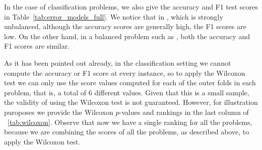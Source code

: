 In the case of classification problems, we also give the accuracy and F1 test scores in Table~\ref{tab:error_models_full}. We notice that in , which is strongly unbalanced, although the accuracy scores are generally high, the F1 scores are low. On the other hand, in a balanced problem such as , both the accuracy and F1 scores are similar.
%

As it has been pointed out already, in the classification setting we cannot compute the accuracy or F1 score at every instance, so to apply the Wilcoxon test we can only use the score values computed for each of the outer folds in each problem, that is, a total of $6$ different values.
Given that this is a small sample, the validity of using the Wilcoxon test is not guaranteed. However, for illustration puroposes we provide the Wilcoxon $p$-values and rankings in the last column of ~\ref{tab:wilcoxon}. Observe that now we have a single ranking for all the problems, because we are combining the scores of all the problems, as described above, to apply the Wilcoxon test.


